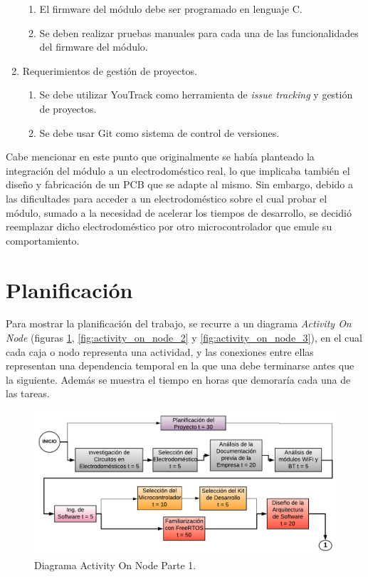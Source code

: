 \begin{enumerate}
	\begin{enumerate}
		\item El firmware del módulo debe ser programado en lenguaje C.
		\item Se deben realizar pruebas manuales para cada una de las funcionalidades del firmware del módulo.
	\end{enumerate}
	\item Requerimientos de gestión de proyectos.
	\begin{enumerate}
		\item Se debe utilizar YouTrack \citep{youtrack} como herramienta de \emph{issue tracking} y gestión de proyectos.
		\item Se debe usar Git como sistema de control de versiones.
	\end{enumerate}
\end{enumerate}

Cabe mencionar en este punto que originalmente se había planteado la integración del módulo a un electrodoméstico real, lo que implicaba también el diseño y fabricación de un PCB que se adapte al mismo. Sin embargo, debido a las dificultades para acceder a un electrodoméstico sobre el cual probar el módulo, sumado a la necesidad de acelerar los tiempos de desarrollo, se decidió reemplazar dicho electrodoméstico por otro microcontrolador que emule su comportamiento.


\section{Planificación}

Para mostrar la planificación del trabajo, se recurre a un diagrama \emph{Activity On Node} (figuras \ref{fig:activity_on_node_1}, \ref{fig:activity_on_node_2} y \ref{fig:activity_on_node_3}), en el cual cada caja o nodo representa una actividad, y las conexiones entre ellas representan una dependencia temporal en la que una debe terminarse antes que la siguiente. Además se muestra el tiempo en horas que demoraría cada una de las tareas.

\begin{figure}[h]
\centering
\includegraphics[width=\textwidth]{./Figures/activity_on_node_1.pdf}
\caption{Diagrama Activity On Node Parte 1.}
\label{fig:activity_on_node_1}
\end{figure}

